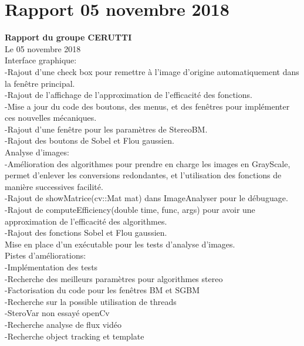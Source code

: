 \documentclass{article}
\begin{document}
\newpage
\section{Rapport 05 novembre 2018}

\textbf{Rapport du groupe CERUTTI}\\
Le 05 novembre 2018\\

Interface graphique:\\
	-Rajout d'une check box pour remettre à l'image d'origine automatiquement dans la fenêtre principal.\\
	-Rajout de l'affichage de l'approximation de l'efficacité des fonctions.\\
	-Mise a jour du code des boutons, des menus, et des fenêtres pour implémenter ces nouvelles mécaniques.\\
	-Rajout d'une fenêtre pour les paramètres de StereoBM.\\
	-Rajout des boutons de Sobel et Flou gaussien.
\\
	
Analyse d'images:\\
	-Amélioration des algorithmes pour prendre en charge les images en GrayScale, permet d'enlever les conversions redondantes, et l'utilisation des fonctions de manière successives facilité.\\
	-Rajout de showMatrice(cv::Mat mat) dans ImageAnalyser pour le débuguage.\\
	-Rajout de computeEfficiency(double time, func, args) pour avoir une approximation de l'efficacité des algorithmes.\\
	-Rajout des fonctions Sobel et Flou gaussien.\\

Mise en place d'un exécutable pour les tests d'analyse d'images.\\

Pistes d'améliorations:\\
	-Implémentation des tests\\
	-Recherche des meilleurs paramètres pour algorithmes stereo\\
	-Factorisation du code pour les fenêtres BM et SGBM\\
	-Recherche sur la possible utilisation de threads\\
	-SteroVar non essayé openCv\\
	-Recherche analyse de flux vidéo\\
	-Recherche object tracking et template
\\\\
\end{document}
